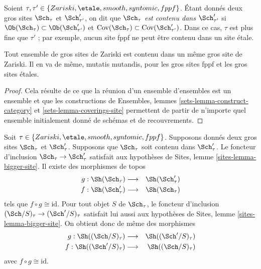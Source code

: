 \medskip\noindent
Soient $\tau, \tau' \in \{Zariski, \etale, smooth, syntomic, fppf\}$.
Étant donnés deux gros sites $\Sch_\tau$ et $\Sch'_{\tau'}$,
on dit que
{\it $\Sch_\tau$ est contenu dans $\Sch'_{\tau'}$} si
$\Ob(\Sch_\tau) \subset \Ob(\Sch'_{\tau'})$
et
$\text{Cov}(\Sch_\tau) \subset \text{Cov}(\Sch'_{\tau'})$.
Dans ce cas, $\tau$ est plus fine que $\tau'$ ; par exemple, aucun site
fppf ne peut être contenu dans un site étale.

\begin{lemma}
\label{lemma-contained-in}
Tout ensemble de gros sites de Zariski est contenu dans un même gros site de Zariski.
Il en va de même, mutatis mutandis, pour les gros sites fppf et les gros sites étales.
\end{lemma}

\begin{proof}
Cela résulte de ce que la réunion d'un ensemble d'ensembles est un ensemble et que les
constructions de Ensembles, lemmes \ref{sets-lemma-construct-category} et
\ref{sets-lemma-coverings-site}
permettent de partir de n'importe quel ensemble initialement donné de schémas
et de recouvrements.
\end{proof}

\begin{lemma}
\label{lemma-change-alpha}
Soit $\tau \in \{Zariski, \etale, smooth, syntomic, fppf\}$.
Supposons donnés deux gros sites $\Sch_\tau$ et $\Sch'_\tau$.
Supposons que $\Sch_\tau$ soit contenu dans $\Sch'_\tau$.
Le foncteur d'inclusion $\Sch_\tau \to \Sch'_\tau$ satisfait
aux hypothèses de Sites, lemme \ref{sites-lemma-bigger-site}.
Il existe des morphismes de topos
\begin{eqnarray*}
g : \Sh(\Sch_\tau) &
\longrightarrow &
\Sh(\Sch'_\tau) \\
f : \Sh(\Sch'_\tau) &
\longrightarrow &
\Sh(\Sch_\tau)
\end{eqnarray*}
tels que $f \circ g \cong \text{id}$. Pour tout objet $S$
de $\Sch_\tau$, le foncteur d'inclusion
$(\Sch/S)_\tau \to (\Sch'/S)_\tau$ satisfait lui aussi
aux hypothèses de Sites, lemme \ref{sites-lemma-bigger-site}.
On obtient donc de même des morphismes
\begin{eqnarray*}
g : \Sh((\Sch/S)_\tau) &
\longrightarrow &
\Sh((\Sch'/S)_\tau) \\
f : \Sh((\Sch'/S)_\tau) &
\longrightarrow &
\Sh((\Sch/S)_\tau)
\end{eqnarray*}
avec $f \circ g \cong \text{id}$.
\end{lemma}

